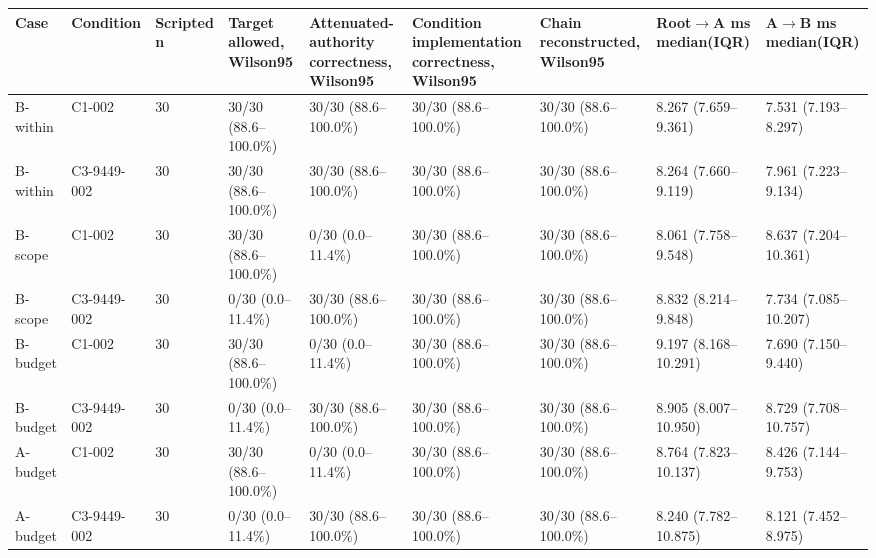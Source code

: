 \begin{tabular}{lllllllll}
\hline
Case & Condition & Scripted n & Target allowed, Wilson95 & Attenuated-authority correctness, Wilson95 & Condition implementation correctness, Wilson95 & Chain reconstructed, Wilson95 & Root$\to$A ms median(IQR) & A$\to$B ms median(IQR) \\
\hline
B-within & C1-002 & 30 & 30/30 (88.6--100.0\%) & 30/30 (88.6--100.0\%) & 30/30 (88.6--100.0\%) & 30/30 (88.6--100.0\%) & 8.267 (7.659--9.361) & 7.531 (7.193--8.297) \\
B-within & C3-9449-002 & 30 & 30/30 (88.6--100.0\%) & 30/30 (88.6--100.0\%) & 30/30 (88.6--100.0\%) & 30/30 (88.6--100.0\%) & 8.264 (7.660--9.119) & 7.961 (7.223--9.134) \\
B-scope & C1-002 & 30 & 30/30 (88.6--100.0\%) & 0/30 (0.0--11.4\%) & 30/30 (88.6--100.0\%) & 30/30 (88.6--100.0\%) & 8.061 (7.758--9.548) & 8.637 (7.204--10.361) \\
B-scope & C3-9449-002 & 30 & 0/30 (0.0--11.4\%) & 30/30 (88.6--100.0\%) & 30/30 (88.6--100.0\%) & 30/30 (88.6--100.0\%) & 8.832 (8.214--9.848) & 7.734 (7.085--10.207) \\
B-budget & C1-002 & 30 & 30/30 (88.6--100.0\%) & 0/30 (0.0--11.4\%) & 30/30 (88.6--100.0\%) & 30/30 (88.6--100.0\%) & 9.197 (8.168--10.291) & 7.690 (7.150--9.440) \\
B-budget & C3-9449-002 & 30 & 0/30 (0.0--11.4\%) & 30/30 (88.6--100.0\%) & 30/30 (88.6--100.0\%) & 30/30 (88.6--100.0\%) & 8.905 (8.007--10.950) & 8.729 (7.708--10.757) \\
A-budget & C1-002 & 30 & 30/30 (88.6--100.0\%) & 0/30 (0.0--11.4\%) & 30/30 (88.6--100.0\%) & 30/30 (88.6--100.0\%) & 8.764 (7.823--10.137) & 8.426 (7.144--9.753) \\
A-budget & C3-9449-002 & 30 & 0/30 (0.0--11.4\%) & 30/30 (88.6--100.0\%) & 30/30 (88.6--100.0\%) & 30/30 (88.6--100.0\%) & 8.240 (7.782--10.875) & 8.121 (7.452--8.975) \\
\hline
\end{tabular}
